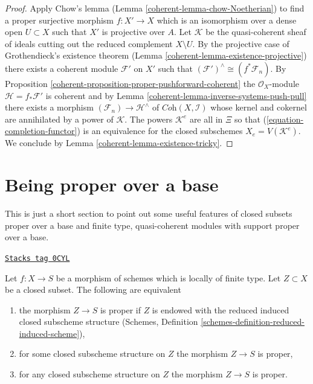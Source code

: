 \begin{proof}
\medskip\noindent
Apply Chow's lemma (Lemma \ref{coherent-lemma-chow-Noetherian}) to find a
proper surjective morphism $f : X' \to X$ which is an isomorphism
over a dense open $U \subset X$ such that $X'$ is projective over $A$.
Let $\mathcal{K}$ be the quasi-coherent sheaf of ideals cutting
out the reduced complement $X \setminus U$. By the projective
case of Grothendieck's existence theorem
(Lemma \ref{coherent-lemma-existence-projective})
there exists a coherent module $\mathcal{F}'$ on $X'$ such
that $(\mathcal{F}')^\wedge \cong (f^*\mathcal{F}_n)$. By
Proposition \ref{coherent-proposition-proper-pushforward-coherent}
the $\mathcal{O}_X$-module $\mathcal{H} = f_*\mathcal{F}'$ is coherent
and by Lemma \ref{coherent-lemma-inverse-systems-push-pull}
there exists a morphism $(\mathcal{F}_n) \to \mathcal{H}^\wedge$
of $\textit{Coh}(X, \mathcal{I})$ whose kernel and cokernel are
annihilated by a power of $\mathcal{K}$. The powers $\mathcal{K}^e$
are all in $\Xi$ so that (\ref{equation-completion-functor})
is an equivalence for the closed subschemes $X_e = V(\mathcal{K}^e)$.
We conclude by Lemma \ref{coherent-lemma-existence-tricky}.
\end{proof}

\section{Being proper over a base}
\label{coherent-section-proper-over-base}
This is just a short section to point out some useful features
of closed subsets proper over a base and finite type, quasi-coherent
modules with support proper over a base.

\begin{lemma}
\label{coherent-lemma-closed-proper-over-base}
\href{https://stacks.math.columbia.edu/tag/0CYL}{\texttt{Stacks tag 0CYL}}

Let $f : X \to S$ be a morphism of schemes which is locally of finite type.
Let $Z \subset X$ be a closed subset. The following are equivalent
\begin{enumerate}
\item the morphism $Z \to S$ is proper if $Z$ is endowed with the reduced
induced closed subscheme structure
(Schemes, Definition \ref{schemes-definition-reduced-induced-scheme}),
\item for some closed subscheme structure on $Z$ the morphism $Z \to S$
is proper,
\item for any closed subscheme structure on $Z$ the morphism
$Z \to S$ is proper.
\end{enumerate}
\end{lemma}

